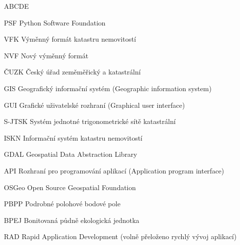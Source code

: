 
\begin{seznamzkratek}{ABCDE}

		  {PSF}
	      {Python Software Foundation}
	      
		  {VFK}
	      {Výměnný formát katastru nemovitostí}
	      
		  {NVF}
	      {Nový výměnný formát}
	      
	      {ČUZK}
	      {Český úřad zeměměřický a katastrální}

	      {GIS}
	      {Geografický informační systém (Geographic information system)}
	         
	      {GUI}
	      {Grafické uživatelské rozhraní (Graphical user interface)}
	           
	      {S-JTSK}
	      {Systém jednotné trigonometrické sítě katastrální}
	  
	      {ISKN}
	      {Informační systém katastru nemovitostí}        
	      
	      {GDAL}
	      {Geospatial Data Abstraction Library}
	      
	      {API}
	      {Rozhraní pro programování aplikací (Application program interface)}    
	      
	      {OSGeo}
	      {Open Source Geospatial Foundation}
	      
	      {PBPP}
	      {Podrobné polohové bodové pole}

	      {BPEJ}
	      {Bonitovaná půdně ekologická jednotka}
	      
	      {RAD}
	      {Rapid Application Development (volně přeloženo rychlý vývoj aplikací)}
	        
\end{seznamzkratek}